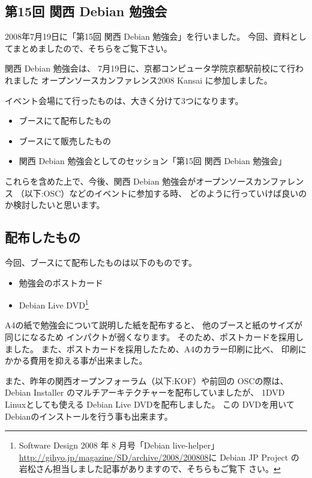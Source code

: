 \documentclass[mingoth,a4paper]{jsarticle}
\begin{document}
\subsection{第15回 関西 Debian 勉強会}

2008年7月19日に「第15回 関西 Debian 勉強会」を行いました。
今回、資料としてまとめましたので、そちらをご覧下さい。

 \label{sec:osckyoto}

関西 Debian 勉強会は、
7月19日に、京都コンピュータ学院京都駅前校にて行われました
オープンソースカンファレンス2008 Kansai
に参加しました。

イベント会場にて行ったものは、大きく分けて3つになります。
\begin{itemize}
 \item ブースにて配布したもの
 \item ブースにて販売したもの
 \item 関西 Debian 勉強会としてのセッション「第15回 関西 Debian 勉強会」
\end{itemize}

これらを含めた上で、今後、関西 Debian 勉強会がオープンソースカンファレンス
（以下:OSC）などのイベントに参加する時、
どのように行っていけば良いのか検討したいと思います。

\subsection{配布したもの}

今回、ブースにて配布したものは以下のものです。

\begin{itemize}
 \item 勉強会のポストカード
 \item Debian Live DVD\footnote{Software Design 2008 年 8 月号「Debian
       live-helper」
       \url{http://gihyo.jp/magazine/SD/archive/2008/200808}に Debian JP
       Project の岩松さん担当しました記事がありますので、そちらもご覧下
       さい。}
\end{itemize}

A4の紙で勉強会について説明した紙を配布すると、
他のブースと紙のサイズが同じになるため
インパクトが弱くなります。
そのため、ポストカードを採用しました。
また、ポストカードを採用したため、A4のカラー印刷に比べ、
印刷にかかる費用を抑える事が出来ました。

また、昨年の関西オープンフォーラム（以下:KOF）や前回の
OSCの際は、
Debian Installer のマルチアーキテクチャーを配布していましたが、
1DVD Linuxとしても使える Debian Live DVDを配布しました。
この DVDを用いてDebianのインストールを行う事も出来ます。
\end{document}
